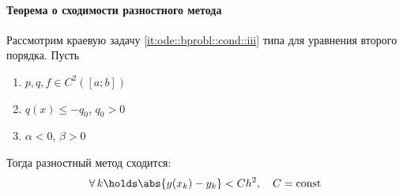 \documentclass{trlnotes}
\begin{document}
\paragraph{Теорема о сходимости разностного метода}
\label{par:ode::finddivconv}


\begin{thrm}\label{thrm:ode::finddivconv::conv}
  Рассмотрим краевую задачу \ref{it:ode::bprobl::cond::iii} типа для уравнения второго порядка.
  Пусть 
  \begin{enumerate}
    \item $p, q, f \in C^2([a;b])$
    \item $q(x) \leqslant -q_0$, $q_0 > 0$
    \item $α < 0$, $β > 0$
  \end{enumerate}
  Тогда разностный метод сходится: 
  \[
    \forall \, k \holds \abs{y(x_k) - y_k} < Ch^2, \quad C=\mathrm{const}
  \]
\end{thrm}
\end{document}
